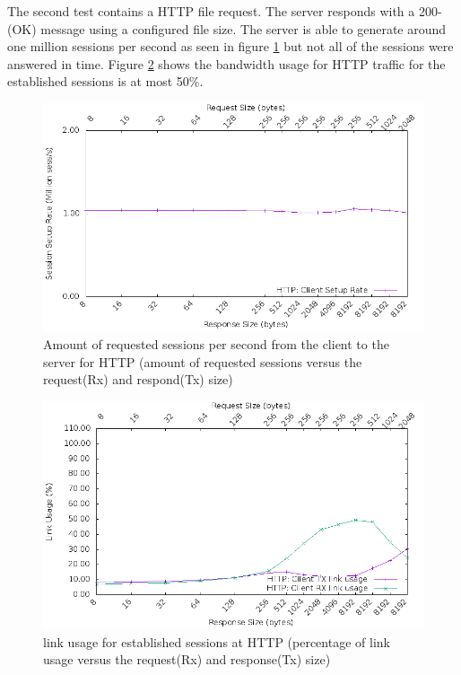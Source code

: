 The second test contains a HTTP file request. The server responds with a 200-(OK) message using a configured file size.
The server is able to generate around one million sessions per second as seen in figure \ref{fig:httpsession} but not all of the sessions were answered in time.
Figure \ref{fig:httplink} shows the bandwidth usage for HTTP traffic for the established sessions is at most 50\%. 


\begin{figure}[H]
  \includegraphics[scale=0.6]{images/http_setup.png}
  \caption{Amount of requested sessions per second from the client to the server for HTTP (amount of requested sessions versus the request(Rx) and respond(Tx) size)}
  \label{fig:httpsession}
\end{figure}

\begin{figure}[H]
  \includegraphics[scale=0.6]{images/http_link_usage.png}
  \caption{link usage for established sessions at HTTP  (percentage of link usage versus the request(Rx) and response(Tx) size)}
  \label{fig:httplink}
\end{figure}

